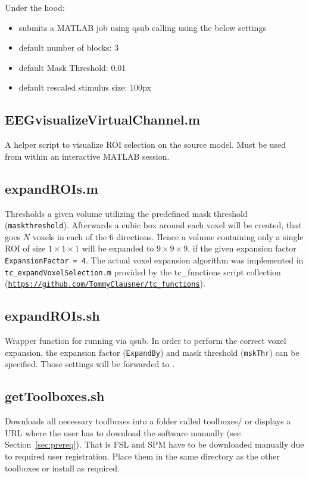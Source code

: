 \documentclass[12pt,a4paper]{scrartcl}
\begin{document}
\noindent Under the hood:
\begin{itemize}
\item submits a MATLAB job using qsub calling \texttt{} using the below settings
\item default number of blocks: 3
\item default Mask Threshold: 0.01
\item default rescaled stimulus size: 100px
\end{itemize}

\subsection{EEGvisualizeVirtualChannel.m}
\label{m:visVirtChan}
A helper script to visualize ROI selection on the source model. Must be used from within an interactive MATLAB session.

\subsection{expandROIs.m}
\label{m:expROI}
Thresholds a given volume utilizing the predefined mask threshold (\texttt{maskthreshold}). Afterwards a cubic box around each voxel will be created, that goes $N$ voxels in each of the 6 directions. Hence a volume containing only a single ROI of size $1\times1\times1$ will be expanded to $9\times9\times9$, if the given expansion factor \texttt{ExpansionFactor = 4}. The actual voxel expansion algorithm was implemented in \texttt{tc\_expandVoxelSelection.m} provided by the tc\_functions script collection (\href{https://github.com/TommyClausner/tc\_functions}{\nolinkurl{https://github.com/TommyClausner/tc\_functions}}).\\

\subsection{expandROIs.sh}
\label{sh:expROI}
Wrapper function for running \texttt{} via qsub. In order to perform the correct voxel expansion, the expansion factor (\texttt{ExpandBy}) and mask threshold (\texttt{mskThr}) can be specified. Those settings will be forwarded to \texttt{}.\\

\subsection{getToolboxes.sh}
\label{sh:getTools}
Downloads all necessary toolboxes into a folder called toolboxes/ or displays a URL where the user has to download the software manually (see Section~\ref{sec:prereq}). That is FSL and SPM have to be downloaded manually due to required user registration. Place them in the same directory as the other toolboxes or install as required.\\
\end{document}
